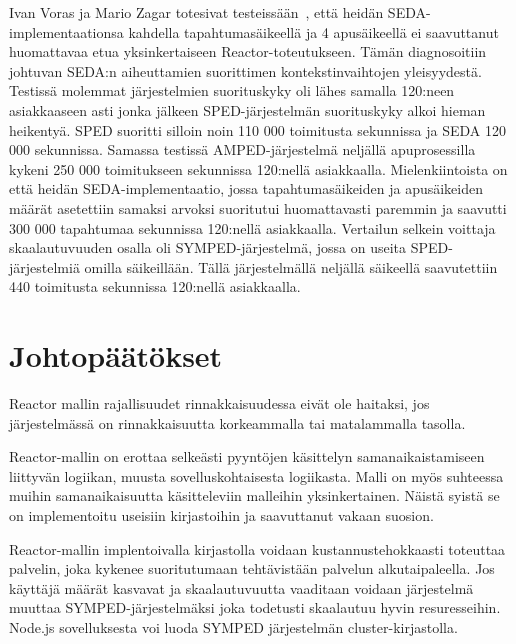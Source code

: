 \documentclass[12pt]{article}
\begin{document}
Ivan Voras ja Mario Zagar totesivat testeissään~\cite{voras_characteristics_2009},
että heidän SEDA-implementaationsa kahdella tapahtumasäikeellä ja 4 apusäikeellä
ei saavuttanut huomattavaa
etua yksinkertaiseen Reactor-toteutukseen. Tämän diagnosoitiin
johtuvan SEDA:n aiheuttamien suorittimen kontekstinvaihtojen yleisyydestä.
Testissä molemmat järjestelmien suorituskyky
oli lähes samalla 120:neen asiakkaaseen asti jonka
jälkeen SPED-järjestelmän suorituskyky alkoi
hieman heikentyä. SPED suoritti silloin noin 110 000 toimitusta sekunnissa
ja SEDA 120 000 sekunnissa. Samassa testissä AMPED-järjestelmä neljällä apuprosessilla
kykeni 250 000 toimitukseen sekunnissa 120:nellä asiakkaalla. Mielenkiintoista on
että heidän SEDA-implementaatio, jossa tapahtumasäikeiden ja apusäikeiden
määrät asetettiin samaksi arvoksi suoritutui huomattavasti paremmin ja
saavutti 300 000 tapahtumaa sekunnissa 120:nellä asiakkaalla.
Vertailun selkein voittaja skaalautuvuuden
osalla oli SYMPED-järjestelmä, jossa on useita SPED-järjestelmiä
omilla säikeillään. Tällä järjestelmällä neljällä säikeellä
saavutettiin 440 toimitusta sekunnissa 120:nellä asiakkaalla.

\section{Johtopäätökset}
Reactor mallin rajallisuudet rinnakkaisuudessa
eivät ole haitaksi, jos järjestelmässä on rinnakkaisuutta
korkeammalla tai matalammalla tasolla.

Reactor-mallin on erottaa 
selkeästi pyyntöjen käsittelyn 
samanaikaistamiseen liittyvän
logiikan, muusta sovelluskohtaisesta logiikasta.
Malli on myös suhteessa muihin samanaikaisuutta
käsitteleviin malleihin yksinkertainen.
Näistä syistä se on implementoitu useisiin
kirjastoihin ja saavuttanut vakaan suosion.

Reactor-mallin implentoivalla 
kirjastolla voidaan kustannustehokkaasti
toteuttaa palvelin, joka kykenee suoritutumaan
tehtävistään palvelun alkutaipaleella. Jos
käyttäjä määrät kasvavat ja skaalautuvuutta
vaaditaan voidaan järjestelmä muuttaa SYMPED-järjestelmäksi
joka todetusti skaalautuu hyvin resuresseihin.
Node.js sovelluksesta voi luoda SYMPED järjestelmän
cluster-kirjastolla.


\end{document}
